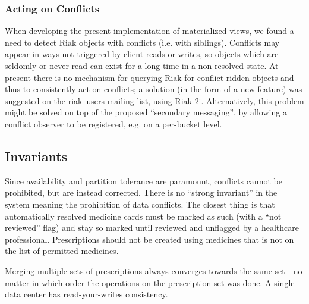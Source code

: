 \documentclass[11pt,a4paper]{report}
\begin{document}
\subsubsection{Acting on Conflicts}
When developing the present implementation of materialized views, we found a need to detect Riak objects with conflicts (i.e. with siblings). Conflicts may appear in ways not triggered by client reads or writes, so objects which are seldomly or never read can exist for a long time in a non-resolved state. At present there is no mechanism for querying Riak for conflict-ridden objects and thus to consistently act on conflicts; a solution (in the form of a new feature) was suggested on the riak--users mailing list, using Riak \gls{2i}.
Alternatively, this problem might be solved on top of the proposed ``secondary messaging'', by allowing a conflict observer to be registered, e.g. on a per-bucket level.

\subsection{Invariants}
Since availability and partition tolerance are paramount, conflicts cannot be prohibited, but are instead corrected. There is no ``strong invariant'' in the system meaning the prohibition of data conflicts. The closest thing is that automatically resolved medicine cards must be marked as such (with a ``not reviewed'' flag) and stay so marked until reviewed and unflagged by a healthcare professional.
Prescriptions should not be created using medicines that is not on  the list of permitted medicines.

Merging multiple sets of prescriptions always converges towards the same set - no matter in which order the operations on the prescription set was done.
A single data center has read-your-writes consistency.
\end{document}
